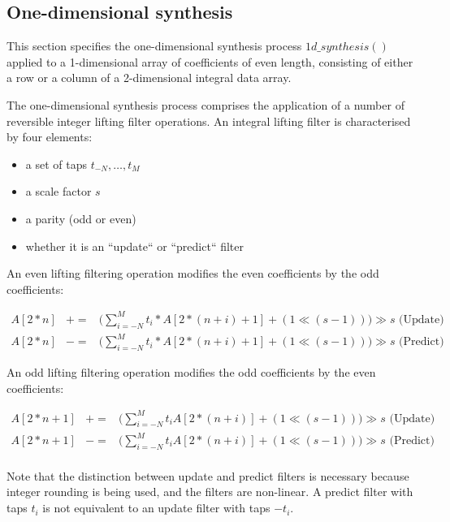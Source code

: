 \subsection{One-dimensional synthesis}
\label{onedsynth}

This section specifies the one-dimensional synthesis process
$1d\_synthesis()$ applied to a 1-dimensional array of coefficients of
even length, consisting
of either a row or a column of a 2-dimensional integral data array.

The one-dimensional synthesis process comprises the application of a
number of reversible integer lifting filter operations. An integral lifting filter
 is characterised by four elements:
\begin{itemize}
\item a set of taps $t_{-N}, \hdots,t_M$
\item a scale factor $s$
\item a parity (odd or even)
\item whether it is an ``update`` or ``predict`` filter
\end{itemize}

An even lifting filtering operation modifies the even coefficients
by the odd coefficients:

\begin{eqnarray*}
  A[2*n]& +=& \big( \sum^M_{i=-N} t_i *A[2*(n+i) + 1] +(1\ll (s-1))\big) \gg s \mbox{ (Update)} \\
  A[2*n]& -=& \big( \sum^M_{i=-N} t_i *A[2*(n+i) + 1] +(1\ll (s-1))\big) \gg s \mbox{ (Predict)}
\end{eqnarray*}

An odd lifting filtering operation modifies the odd coefficients
 by the even coefficients:

\begin{eqnarray*}
  A[2*n+1]& +=&  \big( \sum^M_{i=-N} t_i A[2*(n+i)]+(1\ll (s-1)) \big) \gg s \mbox{ (Update)} \\
  A[2*n+1]& -=&  \big( \sum^M_{i=-N} t_i A[2*(n+i)] +(1\ll (s-1))\big) \gg s \mbox{ (Predict)} \\
\end{eqnarray*}

\begin{informative}
Note that the distinction between update and predict filters is necessary
because integer rounding is being used, and the filters are non-linear.
A predict filter with taps $t_i$ is not equivalent to an update filter with taps $-t_i$.
\end{informative}

